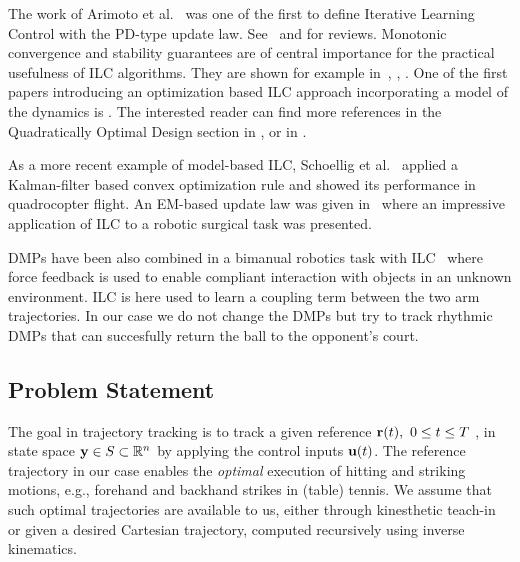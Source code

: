 The work of Arimoto et al.~\cite{Arimoto84} was one of the first to define Iterative Learning Control with the PD-type update law. See~\cite{Bristow06} and \cite{Moore07} for reviews. Monotonic convergence and stability guarantees are of central importance for the practical usefulness of ILC algorithms. They are shown for example in~\cite{Bristow06}, \cite{Norrloef02}, \cite{Longman2000}. One of the first papers introducing an optimization based ILC approach incorporating a model of the dynamics is \cite{Amann95}. The interested reader can find more references in the Quadratically Optimal Design section in \cite{Bristow06}, or in \cite{Moore07}.

As a more recent example of model-based ILC, Schoellig et al.~\cite{Schoellig12} applied a Kalman-filter based convex optimization rule and showed its performance in quadrocopter flight. An EM-based update law was given in~\cite{Berg10} where an impressive application of ILC to a robotic surgical task was presented.

DMPs have been also combined in a bimanual robotics task with ILC~\cite{Gams13} where force feedback is used to enable compliant interaction with objects in an unknown environment. ILC is here used to learn a coupling term between the two arm trajectories. In our case we do not change the DMPs but try to track rhythmic DMPs that can succesfully return the ball to the opponent's court.

\subsection{Problem Statement}\label{problemStatement}

The goal in trajectory tracking is to track a given reference $\boldsymbol{\mathrm{r}}(t), \ 0 \leq t \leq T \ $, in state space $\boldsymbol{\mathrm{y}} \in S \subset \mathbb{R}^{n}$ by applying the control inputs $\boldsymbol{\mathrm{u}}(t)$. The reference trajectory in our case enables the \emph{optimal} execution of hitting and striking motions, e.g., forehand and backhand strikes in (table) tennis. We assume that such optimal trajectories are available to us, either through kinesthetic teach-in or given a desired Cartesian trajectory, computed recursively using inverse kinematics.


